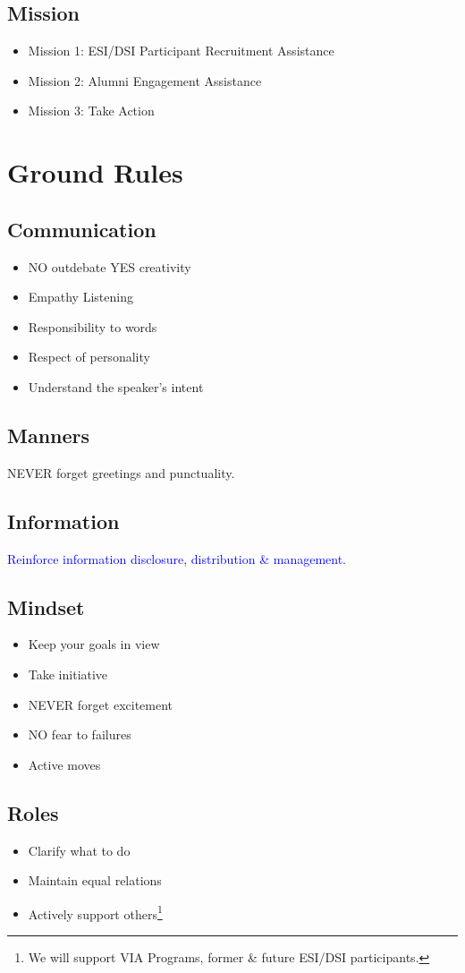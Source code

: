 \documentclass[dvipdfmx]{article}
\begin{document}
\subsection{Mission}
\begin{itemize}
\item Mission 1: ESI/DSI Participant Recruitment Assistance
\item Mission 2: Alumni Engagement Assistance
\item Mission 3: Take Action
\end{itemize}
\section{Ground Rules}
\subsection{Communication}
\begin{itemize}
\item NO outdebate YES creativity
\item Empathy Listening\cite{power}
\item Responsibility to words
\item Respect of personality
\item Understand the speaker's intent
\end{itemize}
\subsection{Manners}
NEVER forget greetings and punctuality.
\subsection{Information}
\textcolor{blue}{Reinforce information disclosure, distribution \& management.}
\subsection{Mindset}
\begin{itemize}
\item Keep your goals in view
\item Take initiative
\item NEVER forget excitement
\item NO fear to failures
\item Active moves
\end{itemize}

\subsection{Roles}
\begin{itemize}
\item Clarify what to do
\item Maintain equal relations
\item Actively support others\footnote{We will support VIA Programs, former \& future ESI/DSI participants.}
\end{itemize}
\end{document}
